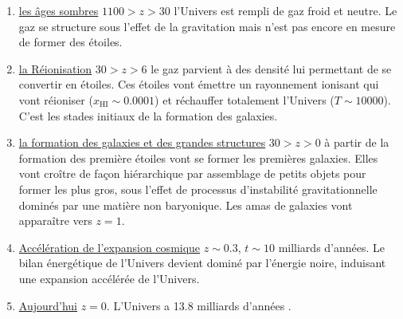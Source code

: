 \begin{enumerate}
\item \underline{les âges sombres} $1100>z>30$  l'Univers est rempli de gaz froid et neutre. Le gaz se structure sous l'effet de la gravitation mais  n'est pas encore en mesure de former des étoiles. 
\item \underline{la Réionisation} $30>z>6$ le gaz parvient à des densité lui permettant de se convertir en étoiles. Ces étoiles vont émettre un rayonnement ionisant qui vont réioniser ($x_\mathrm{HI}\sim0.0001$) et réchauffer totalement l'Univers ($T\sim 10000$). C'est les stades initiaux de la formation des galaxies.
\item \underline{la formation des galaxies et des grandes structures} $30>z>0$ à partir de la formation des première étoiles vont se former les premières galaxies. Elles vont croître de façon hiérarchique  par assemblage de petits objets pour former les plus gros, sous l'effet de processus d'instabilité gravitationnelle dominés par une matière non baryonique. Les amas de galaxies vont apparaître vers $z=1$.
\item \underline{Accélération de l'expansion cosmique} $z\sim 0.3$, $t\sim 10$ milliards d'années. Le bilan énergétique de l'Univers devient dominé par l'énergie noire, induisant une expansion accélérée de l'Univers.
\item \underline{Aujourd'hui} $z=0$. L'Univers a 13.8 milliards d'années .
\end{enumerate}


